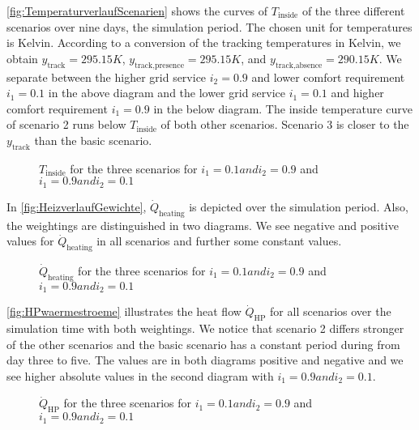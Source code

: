 \autoref{fig:TemperaturverlaufScenarien} shows the curves of $T_\text{inside}$ of the three different scenarios over nine days, the simulation period. The chosen unit for temperatures is Kelvin. According to a conversion of the tracking temperatures in Kelvin, we obtain $y_\text{track} = 295.15 K$, $y_\text{track,presence} = 295.15 K$, and $y_\text{track,absence} = 290.15 K$. We separate between the higher grid service $i_\text{2} = 0.9$ and lower comfort requirement $i_\text{1} = 0.1$ in the above diagram and the lower grid service $i_\text{1} = 0.1$ and higher comfort requirement $i_\text{1} = 0.9$ in the below diagram.\newline 
The inside temperature curve of scenario 2 runs below $T_\text{inside}$ of both other scenarios. Scenario 3 is closer to the $y_\text{track}$ than the basic scenario. 
    \begin{figure}[H]
           \centering
        \def\svgwidth{1\textwidth}
        
        \caption{$T_\text{inside}$ for the three scenarios for $i_\text{1} = 0.1 and i_\text{2} = 0.9$ and $i_\text{1} = 0.9 and i_\text{2} = 0.1$}
         \label{fig:TemperaturverlaufScenarien}
    \end{figure}
 
In \autoref{fig:HeizverlaufGewichte}, $\dot{Q}_\text{heating}$ is depicted over the simulation period. Also, the weightings are distinguished in two diagrams. We see negative and positive values for $\dot{Q}_\text{heating}$ in all scenarios and further some constant values.
     \begin{figure}[H]
           \centering
        \def\svgwidth{1.05\textwidth}
        
        \caption{$\dot{Q}_\text{heating}$ for the three scenarios for $i_\text{1} = 0.1 and i_\text{2} = 0.9$ and $i_\text{1} = 0.9 and i_\text{2} = 0.1$}
         \label{fig:HeizverlaufGewichte}
    \end{figure}
    
\autoref{fig:HPwaermestroeme} illustrates the heat flow $\dot{Q}_\text{HP}$ for all scenarios over the simulation time with both weightings. We notice that scenario 2 differs stronger of the other scenarios and the basic scenario has a constant period during from day three to five. The values are in both diagrams positive and negative and we see higher absolute values in the second diagram with $i_\text{1} = 0.9 and i_\text{2} = 0.1$.

    \begin{figure}[H]
           \centering
        \def\svgwidth{1\textwidth}
        
        \caption{$\dot{Q}_\text{HP}$ for the three scenarios for $i_\text{1} = 0.1 and i_\text{2} = 0.9$ and $i_\text{1} = 0.9 and i_\text{2} = 0.1$}
         \label{fig:HPwaermestroeme}
    \end{figure}
    

